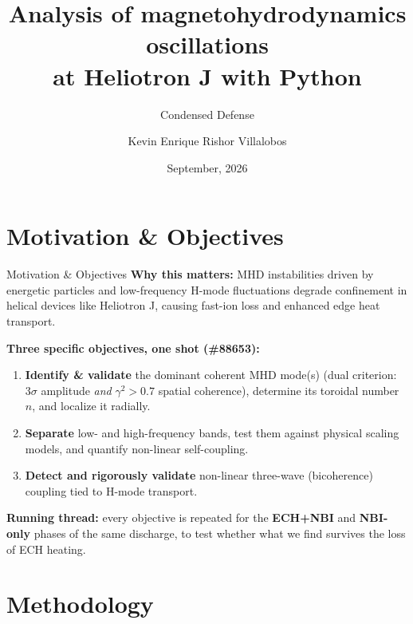 \documentclass[aspectratio=169]{beamer}
\title[MHD Oscillations at Heliotron J]{Analysis of magnetohydrodynamics oscillations \\ at Heliotron J with Python}
\subtitle{Condensed Defense}
\author[K. Rishor Villalobos]{Kevin Enrique Rishor Villalobos}
\institute[TEC \& IAE Kyoto]{
    Physics School, Tecnológico de Costa Rica (TEC) \\
    \vspace{0.2cm}
    Institute of Advanced Energy, Kyoto University
}
\date{September, 2026}
\begin{document}
\begin{frame}
    \titlepage
\end{frame}

\section{Motivation \& Objectives}

\begin{frame}{Motivation \& Objectives}
    \textbf{Why this matters:} MHD instabilities driven by energetic particles and
    low-frequency H-mode fluctuations degrade confinement in helical devices like
    Heliotron J, causing fast-ion loss and enhanced edge heat transport.

    \vspace{0.3cm}
    \textbf{Three specific objectives, one shot (\#88653):}
    \begin{enumerate}
        \item \textbf{Identify \& validate} the dominant coherent MHD mode(s)
        (dual criterion: $3\sigma$ amplitude \emph{and} $\gamma^2>0.7$ spatial coherence),
        determine its toroidal number $n$, and localize it radially.
        \item \textbf{Separate} low- and high-frequency bands, test them against
        physical scaling models, and quantify non-linear self-coupling.
        \item \textbf{Detect and rigorously validate} non-linear three-wave
        (bicoherence) coupling tied to H-mode transport.
    \end{enumerate}

    \vspace{0.2cm}
    \textbf{Running thread:} every objective is repeated for the
    \textbf{ECH+NBI} and \textbf{NBI-only} phases of the same discharge, to test
    whether what we find survives the loss of ECH heating.
\end{frame}

\section{Methodology}
\end{document}
